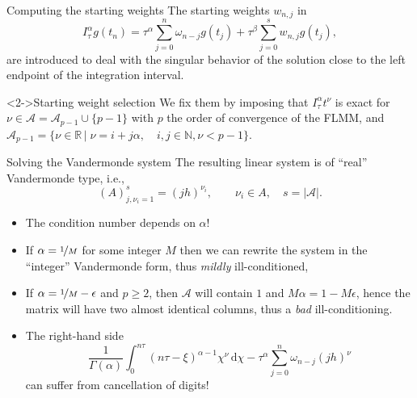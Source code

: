 \documentclass[aspectratio=169,xcolor=dvipsnames]{beamer}
\begin{document}
\begin{frame}{Computing the starting weights}
The starting weights $w_{n,j}$ in 
\[
I_\tau^\alpha g(t_n) = \tau^\alpha \sum_{j=0}^{n} \omega_{n-j} g(t_j) + \tau^\beta \sum_{j=0}^{s} w_{n,j} g(t_j),
\]
are introduced to deal with the singular behavior of the solution close to the left endpoint of the integration interval.

\begin{block}<2->{Starting weight selection}
We fix them by imposing that $I_\tau^\alpha t^\nu$ is exact for $\nu \in \mathcal{A} = \mathcal{A}_{p-1} \cup \{p-1\}$ with $p$ the order of convergence of the FLMM, and  $\mathcal{A}_{p-1} = \{ \nu \in \mathbb{R} \,|\; \nu = i + j \alpha, \quad i,j \in \mathbb{N}, \nu < {p-1}\}$.
\end{block}


\end{frame}

\begin{frame}{Solving the Vandermonde system}
The resulting linear system is of ``real'' Vandermonde type, i.e.,
\[
(A)_{j,\nu_i = 1}^s = (jh)^{\nu_i}, \qquad \nu_{i} \in A, \quad s = |\mathcal{A}|.
\]
\begin{itemize}
	\item The condition number depends on $\alpha$!
	\item<2-> If $\alpha = \nicefrac{1}{M}$ for some integer $M$ then we can rewrite the system in the ``integer'' Vandermonde form, thus \emph{mildly} ill-conditioned,
	\item<3-> If $\alpha = \nicefrac{1}{M} - \epsilon$ and $p \geq 2$, then $\mathcal{A}$ will contain $1$ and $M\alpha = 1 - M\epsilon$, hence the matrix will have two almost identical columns, thus a \emph{bad} ill-conditioning.
	\item<4-> The right-hand side 
	\[
	\frac{1}{\Gamma(\alpha)} \int_{0}^{n\tau} (n\tau - \xi)^{\alpha-1} \chi^\nu\,\textrm{d}\chi - \tau^\alpha \sum_{j=0}^{n} \omega_{n-j} (jh)^\nu
	\]
	can suffer from cancellation of digits!
\end{itemize}

\end{frame}
\end{document}
